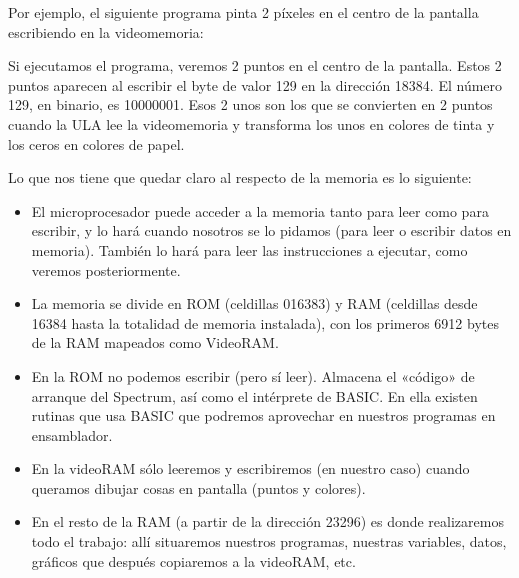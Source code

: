 \documentclass[letterpaper,10pt,spanish]{sphinxmanual}
\begin{document}
Por ejemplo, el siguiente programa pinta 2 píxeles en el centro de la pantalla escribiendo en la videomemoria:

\begin{sphinxVerbatim}[commandchars=\\\{\}]
\end{sphinxVerbatim}

Si ejecutamos el programa, veremos 2 puntos en el centro de la pantalla. Estos 2 puntos aparecen al escribir el byte de valor 129 en la dirección 18384. El número 129, en binario, es 10000001. Esos 2 unos son los que se convierten en 2 puntos cuando la ULA lee la videomemoria y transforma los unos en colores de tinta y los ceros en colores de papel.

Lo que nos tiene que quedar claro al respecto de la memoria es lo siguiente:
\begin{itemize}
\item {} 
El microprocesador puede acceder a la memoria tanto para leer como para escribir, y lo hará cuando nosotros se lo pidamos (para leer o escribir datos en memoria). También lo hará para leer las instrucciones a ejecutar, como veremos posteriormente.

\item {} 
La memoria se divide en ROM (celdillas 0\sphinxhyphen{}16383) y RAM (celdillas desde 16384 hasta la totalidad de memoria instalada), con los primeros 6912 bytes de la RAM mapeados como VideoRAM.

\item {} 
En la ROM no podemos escribir (pero sí leer). Almacena el «código» de arranque del Spectrum, así como el intérprete de BASIC. En ella existen rutinas que usa BASIC que podremos aprovechar en nuestros programas en ensamblador.

\item {} 
En la videoRAM sólo leeremos y escribiremos (en nuestro caso) cuando queramos dibujar cosas en pantalla (puntos y colores).

\item {} 
En el resto de la RAM (a partir de la dirección 23296) es donde realizaremos todo el trabajo: allí situaremos nuestros programas, nuestras variables, datos, gráficos que después copiaremos a la videoRAM, etc.

\end{itemize}
\end{document}
